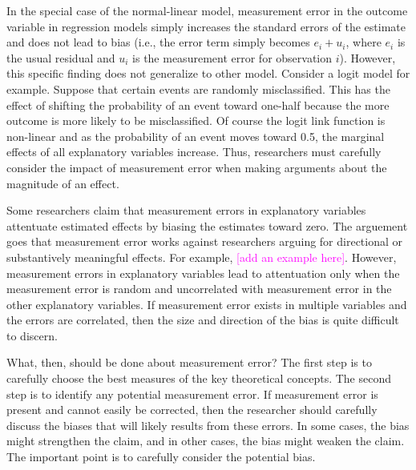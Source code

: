 \documentclass[12pt]{article}
\newcommand{\carlisle}[1]{\textcolor{magenta}{#1}}
\begin{document}

In the special case of the normal-linear model, measurement error in the outcome variable in regression models simply increases the standard errors of the estimate and does not lead to bias (i.e., the error term simply becomes $e_i + u_i$, where $e_i$ is the usual residual and $u_i$ is the measurement error for observation $i$). However, this specific finding does not generalize to other model. Consider a logit model for example. Suppose that certain events are randomly misclassified. This has the effect of shifting the probability of an event toward one-half because the more outcome is more likely to be misclassified. Of course the logit link function is non-linear and as the probability of an event moves toward 0.5, the marginal effects of all explanatory variables increase. Thus, researchers must carefully consider the impact of measurement error when making arguments about the magnitude of an effect.  


Some researchers claim that measurement errors in explanatory variables attentuate estimated effects by biasing the estimates toward zero. The arguement goes that measurement error works against researchers arguing for directional or substantively meaningful effects. For example, \carlisle{[add an example here]}. However, measurement errors in explanatory variables lead to attentuation only when the measurement error is random and uncorrelated with measurement error in the other explanatory variables. If measurement error exists in multiple variables and the errors are correlated, then the size and direction of the bias is quite difficult to discern. 


What, then, should be done about measurement error? The first step is to carefully choose the best measures of the key theoretical concepts. The second step is to identify any potential measurement error. If measurement error is present and cannot easily be corrected, then the researcher should carefully discuss the biases that will likely results from these errors. In some cases, the bias might strengthen the claim, and in other cases, the bias might weaken the claim. The important point is to carefully consider the potential bias.

\end{document}
